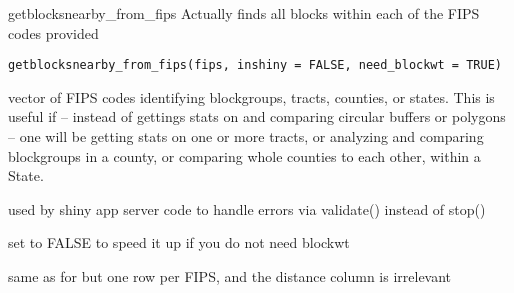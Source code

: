 \documentclass[a4paper]{book}
\begin{document}
%
\begin{Description}\relax
getblocksnearby\_from\_fips
Actually finds all blocks within each of the FIPS codes provided
\end{Description}
%
\begin{Usage}
\begin{verbatim}
getblocksnearby_from_fips(fips, inshiny = FALSE, need_blockwt = TRUE)
\end{verbatim}
\end{Usage}
%
\begin{Arguments}
\begin{ldescription}
\item[\code{fips}] vector of FIPS codes identifying blockgroups, tracts, counties, or states.
This is useful if -- instead of gettings stats on and comparing circular buffers or polygons --
one will be getting stats on one or more tracts,
or analyzing and comparing blockgroups in a county,
or comparing whole counties to each other, within a State.

\item[\code{inshiny}] used by shiny app server code to handle errors via validate() instead of stop()

\item[\code{need\_blockwt}] set to FALSE to speed it up if you do not need blockwt
\end{ldescription}
\end{Arguments}
%
\begin{Value}
same as for  but one row per FIPS, and the distance column is irrelevant
\end{Value}
%
\begin{SeeAlso}\relax
{}   
\end{SeeAlso}
%
\begin{Examples}
\end{Examples}
\end{document}
